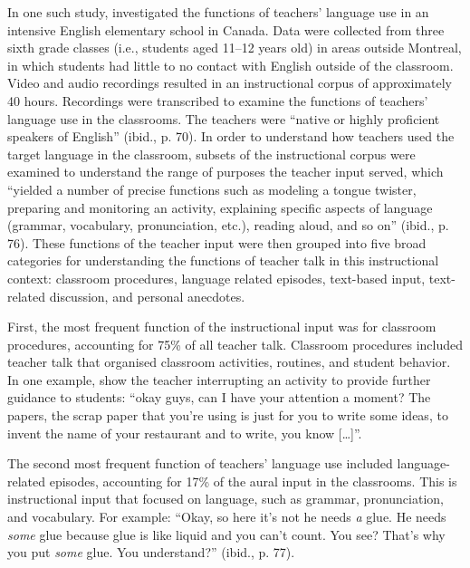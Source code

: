 \documentclass[output=paper,chinesefont]{langscibook}
\begin{document}
In one such study, \citet{CollinsEtAl2012} investigated the functions of teachers’ language use in an intensive English elementary school in Canada. Data were collected from three sixth grade classes (i.e., students aged 11--12 years old) in areas outside Montreal, in which students had little to no contact with English outside of the classroom. Video and audio recordings resulted in an instructional corpus of approximately 40 hours. Recordings were transcribed to examine the functions of teachers’ language use in the classrooms. The teachers were ``native or highly proficient speakers of English'' (ibid., p. 70). In order to understand how teachers used the target language in the classroom, subsets of the instructional corpus were examined to understand the range of purposes the teacher input served, which ``yielded a number of precise functions such as modeling a tongue twister, preparing and monitoring an activity, explaining specific aspects of language (grammar, vocabulary, pronunciation, etc.), reading aloud, and so on'' (ibid., p. 76). These functions of the teacher input were then grouped into five broad categories for understanding the functions of teacher talk in this instructional context: classroom procedures, language related episodes, text-based input, text-related discussion, and personal anecdotes. 

\begin{sloppypar}First, the most frequent function of the instructional input was for classroom procedures, accounting for 75\% of all teacher talk. Classroom procedures included teacher talk that organised classroom activities, routines, and student behavior. In one example, \citet[76]{CollinsEtAl2012} show the teacher interrupting an activity to provide further guidance to students: ``okay guys, can I have your attention a moment? The papers, the scrap paper that you’re using is just for you to write some ideas, to invent the name of your restaurant and to write, you know […]''.\end{sloppypar}

The second most frequent function of teachers’ language use included lan\-guage-re\-lat\-ed episodes, accounting for 17\% of the aural input in the classrooms. This is instructional input that focused on language, such as grammar, pronunciation, and vocabulary. For example: ``Okay, so here it's not he needs \textit{a} glue. He needs \textit{some} glue because glue is like liquid and you can't count. You see? That's why you put \textit{some} glue. You understand?'' (ibid., p. 77).
\end{document}
